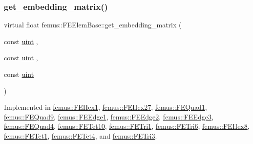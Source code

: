 \mbox{\label{classfemus_1_1_f_e_elem_base_a0c4d6d5ec66bd4e301eb8ea2ef10f354}} 
\subsubsection{\texorpdfstring{get\+\_\+embedding\+\_\+matrix()}{get\_embedding\_matrix()}}
{\footnotesize\ttfamily virtual float femus\+::\+F\+E\+Elem\+Base\+::get\+\_\+embedding\+\_\+matrix (\begin{DoxyParamCaption}\item[{const \mbox{\hyperlink{_typedefs_8hpp_a91ad9478d81a7aaf2593e8d9c3d06a14}{uint}}}]{,  }\item[{const \mbox{\hyperlink{_typedefs_8hpp_a91ad9478d81a7aaf2593e8d9c3d06a14}{uint}}}]{,  }\item[{const \mbox{\hyperlink{_typedefs_8hpp_a91ad9478d81a7aaf2593e8d9c3d06a14}{uint}}}]{ }\end{DoxyParamCaption})\hspace{0.3cm}{\ttfamily [pure virtual]}}



Implemented in \mbox{\hyperlink{classfemus_1_1_f_e_hex1_aaa8731caede9d90c2fee78a7440f610a}{femus\+::\+F\+E\+Hex1}}, \mbox{\hyperlink{classfemus_1_1_f_e_hex27_a0bfb79afd1a19396983b0ea03daf00ff}{femus\+::\+F\+E\+Hex27}}, \mbox{\hyperlink{classfemus_1_1_f_e_quad1_a28f67697594e281a16e395df3ee3ae54}{femus\+::\+F\+E\+Quad1}}, \mbox{\hyperlink{classfemus_1_1_f_e_quad9_a2c82794ee74ebbbde0fd8e9c9b73ba7a}{femus\+::\+F\+E\+Quad9}}, \mbox{\hyperlink{classfemus_1_1_f_e_edge1_a25ca224b3f755062f03cc12d9da92a9a}{femus\+::\+F\+E\+Edge1}}, \mbox{\hyperlink{classfemus_1_1_f_e_edge2_ab8a267a26f4930b636d6c5c14d2280dc}{femus\+::\+F\+E\+Edge2}}, \mbox{\hyperlink{classfemus_1_1_f_e_edge3_a89085312a08628bcff678c347c0a82e4}{femus\+::\+F\+E\+Edge3}}, \mbox{\hyperlink{classfemus_1_1_f_e_quad4_a1532326493b4b2477fffa1b97617fb99}{femus\+::\+F\+E\+Quad4}}, \mbox{\hyperlink{classfemus_1_1_f_e_tet10_a5db8941e2d1acf599b6119405d1bc77a}{femus\+::\+F\+E\+Tet10}}, \mbox{\hyperlink{classfemus_1_1_f_e_tri1_a6cbbc2c44efa0f45ae4cfe2c75d8011f}{femus\+::\+F\+E\+Tri1}}, \mbox{\hyperlink{classfemus_1_1_f_e_tri6_ab279faaaec620922946e9a1119493607}{femus\+::\+F\+E\+Tri6}}, \mbox{\hyperlink{classfemus_1_1_f_e_hex8_a6e1819ed6e7597f1109f3d314d1c1f1b}{femus\+::\+F\+E\+Hex8}}, \mbox{\hyperlink{classfemus_1_1_f_e_tet1_a2963e6669725e8df2e98c30c1c82f91d}{femus\+::\+F\+E\+Tet1}}, \mbox{\hyperlink{classfemus_1_1_f_e_tet4_a36513f2c430b37b0dd47e4ad5827fd01}{femus\+::\+F\+E\+Tet4}}, and \mbox{\hyperlink{classfemus_1_1_f_e_tri3_ad9dd0717627d89b61a2536d9da42f17e}{femus\+::\+F\+E\+Tri3}}.

